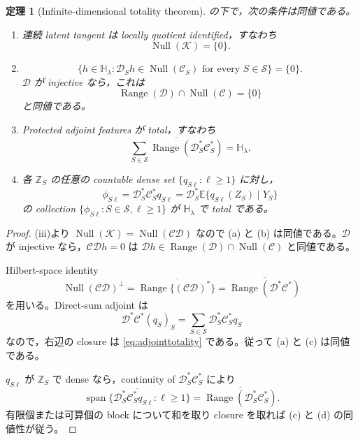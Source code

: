 \documentclass[11pt,a4paper]{ltjsarticle}
\newtheorem{theorem}{定理}[section]
\theoremstyle{remark}
\newcommand{\E}{\mathbb E}
\newcommand{\cS}{\mathcal S}
\newcommand{\Cop}{\mathscr C}
\newcommand{\Jcal}{\mathscr D}
\newcommand{\Kop}{\mathscr K}
\newcommand{\Null}{\operatorname{Null}}
\newcommand{\Range}{\operatorname{Range}}
\newcommand{\Span}{\operatorname{span}}
\begin{document}
\begin{theorem}[Infinite-dimensional totality theorem]\label{thm:continuoustotality}
の下で，次の条件は同値である。
\begin{enumerate}[label=(\alph*)]
\item 連続 latent tangent は locally quotient identified，すなわち
\[
\Null(\Kop)=\{0\}.
\]
\item
\begin{equation}
\{h\in\mathbb H_\lambda:\Jcal_Sh\in\Null(\Cop_S)
\text{ for every }S\in\cS\}=\{0\}.
\label{eq:restrictedcompleteness}
\end{equation}
$\Jcal$ が injective なら，これは
\begin{equation}
\Range(\Jcal)\cap\Null(\Cop)=\{0\}
\label{eq:transverseintersection}
\end{equation}
と同値である。
\item Protected adjoint features が total，すなわち
\begin{equation}
\overline{
\sum_{S\in\cS}
\Range(\Jcal_S^*\Cop_S^*)
}
=\mathbb H_\lambda.
\label{eq:adjointtotality}
\end{equation}
\item 各 $\mathbb Z_S$ の任意の countable dense set $\{q_{S\ell}:\ell\ge1\}$ に対し，
\begin{equation}
\phi_{S\ell}
=\Jcal_S^*\Cop_S^*q_{S\ell}
=\Jcal_S^*\E\{q_{S\ell}(Z_S)\mid Y_S\}
\label{eq:protectedfeatures}
\end{equation}
の collection $\{\phi_{S\ell}:S\in\cS,\ell\ge1\}$ が $\mathbb H_\lambda$ で total である。
\end{enumerate}
\end{theorem}

\begin{proof}
(iii)より $\Null(\Kop)=\Null(\Cop\Jcal)$ なので (a) と (b) は同値である。$\Jcal$ が injective なら，$\Cop\Jcal h=0$ は $\Jcal h\in\Range(\Jcal)\cap\Null(\Cop)$ と同値である。

Hilbert-space identity
\[
\Null(\Cop\Jcal)^\perp
=\overline{\Range\{(\Cop\Jcal)^*\}}
=\overline{\Range(\Jcal^*\Cop^*)}
\]
を用いる。Direct-sum adjoint は
\[
\Jcal^*\Cop^*(q_S)_S
=\sum_{S\in\cS}\Jcal_S^*\Cop_S^*q_S
\]
なので，右辺の closure は \eqref{eq:adjointtotality} である。従って (a) と (c) は同値である。

$q_{S\ell}$ が $\mathbb Z_S$ で dense なら，continuity of $\Jcal_S^*\Cop_S^*$ により
\[
\overline{\Span\{\Jcal_S^*\Cop_S^*q_{S\ell}:\ell\ge1\}}
=\overline{\Range(\Jcal_S^*\Cop_S^*)}.
\]
有限個または可算個の block について和を取り closure を取れば (c) と (d) の同値性が従う。
\end{proof}
\end{document}

